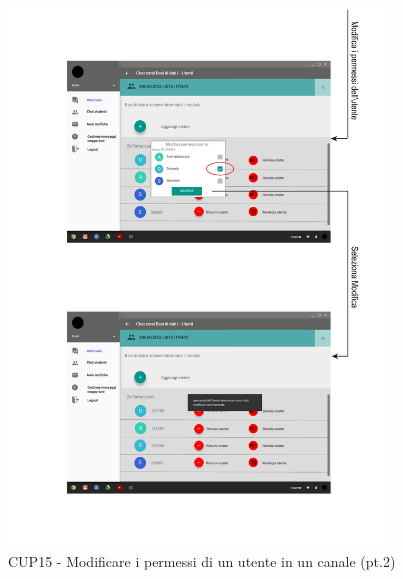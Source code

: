 \begin{figure}
	\centering
	\includegraphics[width=0.9\textwidth]{imgs/gruppo6/activities/act_cup15_modifica_permessi_utente2.pdf}
	\caption{CUP15 - Modificare i permessi di un utente in un canale (pt.2)}
	\label{fig:cup15-2}
\end{figure}

